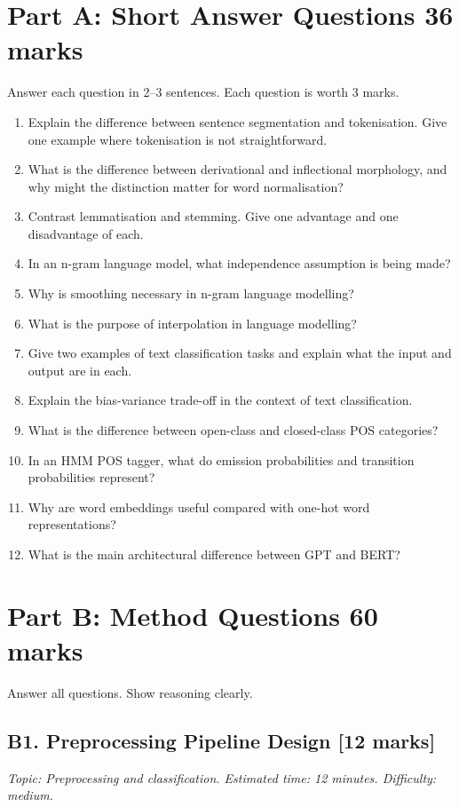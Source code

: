 \documentclass[11pt,a4paper]{article}
\newcommand{\qmarks}[1]{\hfill\textbf{[#1 marks]}}
\newcommand{\questionmeta}[3]{\textit{Topic: #1. Estimated time: #2. Difficulty: #3.}}
\begin{document}
\section*{Part A: Short Answer Questions \hfill 36 marks}

Answer each question in 2--3 sentences. Each question is worth 3 marks.

\begin{enumerate}
\item Explain the difference between sentence segmentation and tokenisation. Give one example where tokenisation is not straightforward.
\item What is the difference between derivational and inflectional morphology, and why might the distinction matter for word normalisation?
\item Contrast lemmatisation and stemming. Give one advantage and one disadvantage of each.
\item In an n-gram language model, what independence assumption is being made?
\item Why is smoothing necessary in n-gram language modelling?
\item What is the purpose of interpolation in language modelling?
\item Give two examples of text classification tasks and explain what the input and output are in each.
\item Explain the bias-variance trade-off in the context of text classification.
\item What is the difference between open-class and closed-class POS categories?
\item In an HMM POS tagger, what do emission probabilities and transition probabilities represent?
\item Why are word embeddings useful compared with one-hot word representations?
\item What is the main architectural difference between GPT and BERT?
\end{enumerate}

\section*{Part B: Method Questions \hfill 60 marks}

Answer all questions. Show reasoning clearly.

\subsection*{B1. Preprocessing Pipeline Design \qmarks{12}}
\questionmeta{Preprocessing and classification}{12 minutes}{medium}
\end{document}
